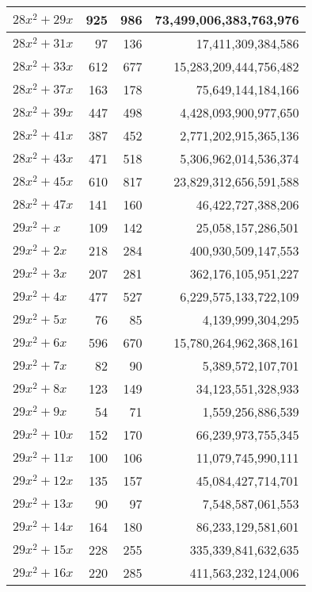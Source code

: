 \documentclass[a4paper]{amsproc}
\theoremstyle{plain}
\theoremstyle{named}
\begin{document}
\begin{longtable}{ | l | r | r | r | }
$28x^2 + 29x$ & 925 & 986 & 73{,}499{,}006{,}383{,}763{,}976 \\ \hline
$28x^2 + 31x$ & 97 & 136 & 17{,}411{,}309{,}384{,}586 \\ \hline
$28x^2 + 33x$ & 612 & 677 & 15{,}283{,}209{,}444{,}756{,}482 \\ \hline
$28x^2 + 37x$ & 163 & 178 & 75{,}649{,}144{,}184{,}166 \\ \hline
$28x^2 + 39x$ & 447 & 498 & 4{,}428{,}093{,}900{,}977{,}650 \\ \hline
$28x^2 + 41x$ & 387 & 452 & 2{,}771{,}202{,}915{,}365{,}136 \\ \hline
$28x^2 + 43x$ & 471 & 518 & 5{,}306{,}962{,}014{,}536{,}374 \\ \hline
$28x^2 + 45x$ & 610 & 817 & 23{,}829{,}312{,}656{,}591{,}588 \\ \hline
$28x^2 + 47x$ & 141 & 160 & 46{,}422{,}727{,}388{,}206 \\ \hline
$29x^2 + x$ & 109 & 142 & 25{,}058{,}157{,}286{,}501 \\ \hline
$29x^2 + 2x$ & 218 & 284 & 400{,}930{,}509{,}147{,}553 \\ \hline
$29x^2 + 3x$ & 207 & 281 & 362{,}176{,}105{,}951{,}227 \\ \hline
$29x^2 + 4x$ & 477 & 527 & 6{,}229{,}575{,}133{,}722{,}109 \\ \hline
$29x^2 + 5x$ & 76 & 85 & 4{,}139{,}999{,}304{,}295 \\ \hline
$29x^2 + 6x$ & 596 & 670 & 15{,}780{,}264{,}962{,}368{,}161 \\ \hline
$29x^2 + 7x$ & 82 & 90 & 5{,}389{,}572{,}107{,}701 \\ \hline
$29x^2 + 8x$ & 123 & 149 & 34{,}123{,}551{,}328{,}933 \\ \hline
$29x^2 + 9x$ & 54 & 71 & 1{,}559{,}256{,}886{,}539 \\ \hline
$29x^2 + 10x$ & 152 & 170 & 66{,}239{,}973{,}755{,}345 \\ \hline
$29x^2 + 11x$ & 100 & 106 & 11{,}079{,}745{,}990{,}111 \\ \hline
$29x^2 + 12x$ & 135 & 157 & 45{,}084{,}427{,}714{,}701 \\ \hline
$29x^2 + 13x$ & 90 & 97 & 7{,}548{,}587{,}061{,}553 \\ \hline
$29x^2 + 14x$ & 164 & 180 & 86{,}233{,}129{,}581{,}601 \\ \hline
$29x^2 + 15x$ & 228 & 255 & 335{,}339{,}841{,}632{,}635 \\ \hline
$29x^2 + 16x$ & 220 & 285 & 411{,}563{,}232{,}124{,}006 \\ \hline

\end{longtable}
\end{document}
